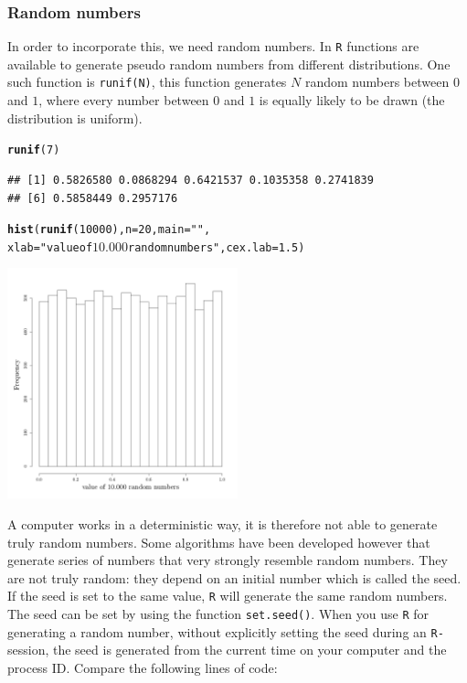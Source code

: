 \documentclass{article}\usepackage[]{graphicx}\usepackage[]{color}
\makeatletter
\newcommand{\hlnum}[1]{\textcolor[rgb]{0.686,0.059,0.569}{#1}}%
\newcommand{\hlstr}[1]{\textcolor[rgb]{0.192,0.494,0.8}{#1}}%
\newcommand{\hlstd}[1]{\textcolor[rgb]{0.345,0.345,0.345}{#1}}%
\newcommand{\hlkwc}[1]{\textcolor[rgb]{0.333,0.667,0.333}{#1}}%
\newcommand{\hlkwd}[1]{\textcolor[rgb]{0.737,0.353,0.396}{\textbf{#1}}}%
\newenvironment{kframe}{%
 \def\at@end@of@kframe{}%
 \ifinner\ifhmode%
  \def\at@end@of@kframe{\end{minipage}}%
  \begin{minipage}{\columnwidth}%
 \fi\fi%
 \def\FrameCommand##1{\hskip\@totalleftmargin \hskip-\fboxsep
 \colorbox{shadecolor}{##1}\hskip-\fboxsep
     \hskip-\linewidth \hskip-\@totalleftmargin \hskip\columnwidth}%
 \MakeFramed {\advance\hsize-\width
   \@totalleftmargin\z@ \linewidth\hsize
   \@setminipage}}%
 {\par\unskip\endMakeFramed%
 \at@end@of@kframe}
\newenvironment{knitrout}{}{} %
\makeatother
\begin{document}
\subsubsection{Random numbers}
In order to incorporate this, we need random numbers. In \texttt{R} functions are available to generate pseudo random numbers from different distributions. One such function is \texttt{runif(N)}, this function generates $N$ random numbers between $0$ and $1$, where every number between $0$ and $1$ is equally likely to be drawn (the distribution is uniform).
\begin{knitrout}
\color{fgcolor}\begin{kframe}
\begin{alltt}
\hlkwd{runif}\hlstd{(}\hlnum{7}\hlstd{)}
\end{alltt}
\begin{verbatim}
## [1] 0.5826580 0.0868294 0.6421537 0.1035358 0.2741839
## [6] 0.5858449 0.2957176
\end{verbatim}
\begin{alltt}
\hlkwd{hist}\hlstd{(}\hlkwd{runif}\hlstd{(}\hlnum{10000}\hlstd{),}\hlkwc{n}\hlstd{=}\hlnum{20}\hlstd{,}\hlkwc{main}\hlstd{=}\hlstr{""}\hlstd{,}
     \hlkwc{xlab}\hlstd{=}\hlstr{"value of $10.000$ random numbers"}\hlstd{,} \hlkwc{cex.lab}\hlstd{=}\hlnum{1.5}\hlstd{)}
\end{alltt}
\end{kframe}

{\centering \includegraphics[width=0.5\textwidth]{figure/k19-1} 

}



\end{knitrout}
A computer works in a deterministic way, it is therefore not able to generate truly random numbers. Some algorithms have been developed however that generate series of numbers that very strongly resemble random numbers. They are not truly random: they depend on an initial number which is called the seed. If the seed is set to the same value, \texttt{R} will generate the same random numbers. The seed can be set by using the function \texttt{set.seed()}. When you use \texttt{R} for generating a random number, without explicitly setting the seed during an \texttt{R-}session, the seed is generated from the current time on your computer and the process ID. Compare the following lines of code:
\end{document}
